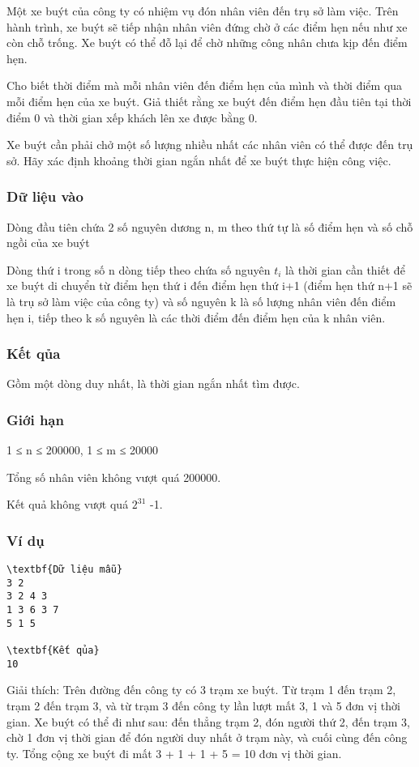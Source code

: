 



   Một xe buýt của công ty có nhiệm vụ đón nhân viên đến trụ sở làm việc. Trên hành trình, xe buýt sẽ tiếp nhận nhân viên đứng chờ ở các điểm hẹn   nếu như xe còn chỗ trống. Xe buýt có thể đỗ lại để chờ những công nhân chưa kịp đến điểm hẹn.  

   Cho biết thời điểm mà mỗi nhân viên đến điểm hẹn của mình và thời điểm qua mỗi điểm hẹn của xe buýt. Giả thiết rằng xe buýt đến điểm hẹn đầu   tiên tại thời điểm 0 và thời gian xếp khách lên xe được bằng 0.  

   Xe buýt cần phải chở một số lượng nhiều nhất các nhân viên có thể được đến trụ sở. Hãy xác định khoảng thời gian ngắn nhất để xe buýt thực hiện   công việc.  

\subsubsection{   Dữ liệu vào  }

   Dòng đầu tiên chứa 2 số nguyên dương n, m theo thứ tự là số điểm hẹn và số chỗ ngồi của xe buýt  

   Dòng thứ i trong số n dòng tiếp theo chứa số nguyên $t_{i}$   là thời gian cần thiết để xe buýt di chuyển từ điểm hẹn thứ i đến điểm hẹn thứ   i+1 (điểm hẹn thứ n+1 sẽ là trụ sở làm việc của công ty) và số nguyên k là số lượng nhân viên đến điểm hẹn i, tiếp theo k số nguyên là các thời điểm đến   điểm hẹn của k nhân viên.  

\subsubsection{   Kết qủa  }

   Gồm một dòng duy nhất, là thời gian ngắn nhất tìm được.  

\subsubsection{   Giới hạn  }

   1 ≤ n ≤ 200000, 1 ≤ m ≤ 20000  

   Tổng số nhân viên không vượt quá 200000.  

   Kết quả không vượt quá $2^{31}$   -1.  

\subsubsection{   Ví dụ  }
\begin{verbatim}
\textbf{Dữ liệu mẫu}
3 2
3 2 4 3
1 3 6 3 7
5 1 5

\textbf{Kết qủa}
10
\end{verbatim}

   Giải thích: Trên đường đến công ty có 3 trạm xe buýt. Từ trạm 1 đến trạm 2, trạm 2 đến trạm 3, và từ trạm 3 đến công ty lần lượt mất 3, 1 và 5 đơn vị thời gian. Xe buýt có thể đi như sau: đến thẳng trạm 2, đón người thứ 2, đến trạm 3, chờ 1 đơn vị thời gian để đón người duy nhất ở trạm này, và cuối cùng đến công ty. Tổng cộng xe buýt đi mất 3 + 1 + 1 + 5 = 10 đơn vị thời gian.  
